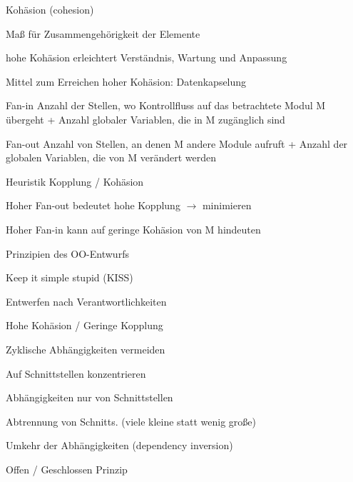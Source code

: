 \documentclass[a4paper]{article}
\begin{document}
\begin{multicols}{3}
  Kohäsion (cohesion)
  \begin{itemize*}
    \item Maß für Zusammengehörigkeit der Elemente
    \item hohe Kohäsion erleichtert Verständnis, Wartung und Anpassung
    \item Mittel zum Erreichen hoher Kohäsion: Datenkapselung
  \end{itemize*}
  \begin{description*}
    \item[Fan-in] Anzahl der Stellen, wo Kontrollfluss auf das betrachtete Modul M übergeht + Anzahl globaler Variablen, die in M zugänglich sind
    \item[Fan-out] Anzahl von Stellen, an denen M andere Module aufruft + Anzahl der globalen Variablen, die von M verändert werden
  \end{description*}
    \begin{itemize*}
    \item Heuristik Kopplung / Kohäsion
    \begin{itemize*}
      \item Hoher Fan-out bedeutet hohe Kopplung $\rightarrow$ minimieren
      \item Hoher Fan-in kann auf geringe Kohäsion von M hindeuten
    \end{itemize*}
  \end{itemize*}


  Prinzipien des OO-Entwurfs
  \begin{itemize*}
    \item Keep it simple stupid (KISS)
    \item Entwerfen nach Verantwortlichkeiten
    \item Hohe Kohäsion / Geringe Kopplung
    \item Zyklische Abhängigkeiten vermeiden
    \item Auf Schnittstellen konzentrieren
    \begin{itemize*}
      \item Abhängigkeiten nur von Schnittstellen
      \item Abtrennung von Schnitts. (viele kleine statt wenig große)
      \item Umkehr der Abhängigkeiten (dependency inversion)
    \end{itemize*}
    \item Offen / Geschlossen Prinzip
  \end{itemize*}


\end{multicols}
\end{document}
